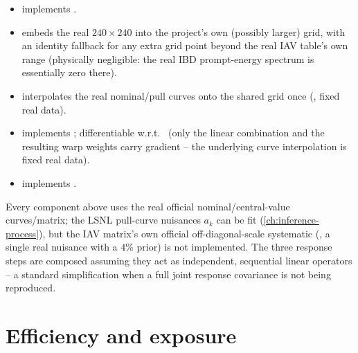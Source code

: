 \begin{implbox}
\begin{itemize}
  \item {} implements
    .
  \item {} embeds the real
    $240\times240$  into the project's own (possibly
    larger) grid, with an identity fallback for any extra grid point beyond
    the real IAV table's own range (physically negligible: the real IBD
    prompt-energy spectrum is essentially zero there).
  \item {} interpolates the
    real nominal/pull curves onto the shared grid once
    (, fixed real data).
  \item {}
    implements ;
    differentiable w.r.t.\  (only the linear combination
    and the resulting warp weights carry gradient -- the underlying curve
    interpolation is fixed real data).
  \item {} implements .
\end{itemize}
\end{implbox}

\begin{notebox}
Every component above uses the real official nominal/central-value
curves/matrix; the LSNL pull-curve nuisances $a_k$ can be fit
(\cref{ch:inference-process}), but the IAV matrix's own official
off-diagonal-scale systematic (,
a single real nuisance with a $4\%$ prior) is not implemented. The three
response steps are composed assuming they act as independent, sequential
linear operators -- a standard simplification when a full joint response
covariance is not being reproduced.
\end{notebox}

\section{Efficiency and exposure}
\label{sec:efficiency-exposure}

